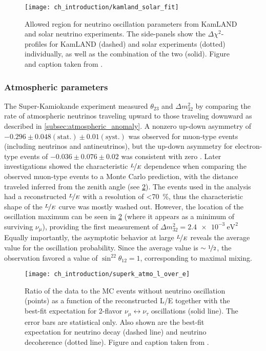 \begin{figure}
    \centering
    \texttt{[image: ch\_introduction/kamland\_solar\_fit]}
    \caption{
        Allowed region for neutrino oscillation parameters from KamLAND and solar
        neutrino experiments.
        The side-panels show the $\Delta \chi^2$-profiles
        for KamLAND (dashed) and solar experiments (dotted) individually,
        as well as the combination of the two (solid).
        Figure and caption taken from \cite{kamland_latest}.
    }
    \label{fig:kamland_plus_solar}
\end{figure}

\subsubsection{Atmospheric parameters}
The Super-Kamiokande experiment measured $\theta_{23}$ and $\Delta m^2_{32}$
by comparing the rate of atmospheric neutrinos
traveling upward to those traveling downward
as described in \cref{subsec:atmospheric_anomaly}.
A nonzero up-down asymmetry of $-0.296\pm0.048(\text{stat.})\pm0.01(\text{syst.})$
was observed for muon-type events (including neutrinos and antineutrinos),
but the up-down asymmetry for electron-type events
of $-0.036\pm0.076\pm0.02$ was consistent with zero \cite{superk1998}.
Later investigations \cite{superk2004} showed the characteristic $\nicefrac{L}{E}$
dependence when comparing the observed muon-type events
to a Monte Carlo prediction,
with the distance traveled inferred from the zenith angle
(see \cref{fig:superk_l_over_e}).
The events used in the analysis had a reconstructed $\nicefrac{L}{E}$
with a resolution of \SI{<70}{\percent},
thus the characteristic shape of the $\nicefrac{L}{E}$ curve
was mostly washed out.
However, the location of the oscillation maximum
can be seen in \cref{fig:superk_l_over_e}
(where it appears as a minimum of surviving $\nu_\mu$),
providing the first measurement of $\Delta m^2_{32} = \SI{2.4e-3}{\eV\squared}$
Equally importantly, the asymptotic behavior
at large $\nicefrac{L}{E}$ reveals
the average value for the oscillation probability.
Since the average value is $\sim\nicefrac{1}{2}$,
the observation favored a value of $\sin^22\theta_{12} = 1$,
corresponding to maximal mixing.

\begin{figure}
    \centering
    \texttt{[image: ch\_introduction/superk\_atmo\_l\_over\_e]}
    \caption{
        Ratio of the data to the MC events without neutrino oscillation (points)
        as a function of the reconstructed L/E together with
        the best-fit expectation for 2-flavor $\nu_\mu\leftrightarrow\nu_\tau$
        oscillations (solid line).
        The error bars are statistical only.
        Also shown are the best-fit expectation for neutrino decay (dashed line)
        and neutrino decoherence (dotted line).
        Figure and caption taken from \cite{superk2004}.
    }
    \label{fig:superk_l_over_e}
\end{figure}

